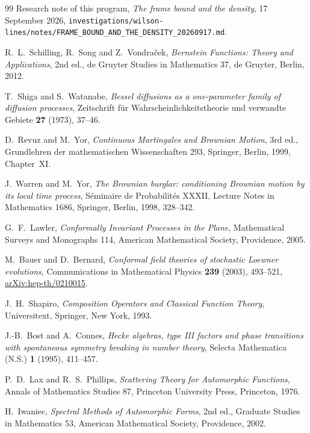 \begin{thebibliography}{99}
Research note of this program, \emph{The frame bound and the density},
17 September 2026,
\texttt{investigations/wilson-lines/notes/\allowbreak FRAME\_BOUND\_AND\_THE\_DENSITY\_20260917.md}.

R.~L.~Schilling, R.~Song and Z.~Vondra\v{c}ek, \emph{Bernstein Functions:
Theory and Applications}, 2nd ed., de Gruyter Studies in Mathematics 37,
de Gruyter, Berlin, 2012.

T.~Shiga and S.~Watanabe, \emph{Bessel diffusions as a one-parameter family of
diffusion processes}, Zeitschrift f\"ur Wahrscheinlichkeitstheorie und
verwandte Gebiete \textbf{27} (1973), 37--46.

D.~Revuz and M.~Yor, \emph{Continuous Martingales and Brownian Motion},
3rd ed., Grundlehren der mathematischen Wissenschaften 293, Springer, Berlin,
1999, Chapter~XI.

J.~Warren and M.~Yor, \emph{The Brownian burglar: conditioning Brownian motion
by its local time process}, S\'eminaire de Probabilit\'es XXXII, Lecture Notes
in Mathematics 1686, Springer, Berlin, 1998, 328--342.

G.~F.~Lawler, \emph{Conformally Invariant Processes in the Plane},
Mathematical Surveys and Monographs 114, American Mathematical Society,
Providence, 2005.

M.~Bauer and D.~Bernard, \emph{Conformal field theories of stochastic Loewner
evolutions}, Communications in Mathematical Physics \textbf{239} (2003),
493--521, \href{https://arxiv.org/abs/hep-th/0210015}{arXiv:hep-th/0210015}.

J.~H.~Shapiro, \emph{Composition Operators and Classical Function Theory},
Universitext, Springer, New York, 1993.

J.-B.~Bost and A.~Connes, \emph{Hecke algebras, type III factors and phase
transitions with spontaneous symmetry breaking in number theory}, Selecta
Mathematica (N.S.) \textbf{1} (1995), 411--457.

P.~D.~Lax and R.~S.~Phillips, \emph{Scattering Theory for Automorphic
Functions}, Annals of Mathematics Studies 87, Princeton University Press,
Princeton, 1976.

H.~Iwaniec, \emph{Spectral Methods of Automorphic Forms}, 2nd ed., Graduate
Studies in Mathematics 53, American Mathematical Society, Providence, 2002.
\end{thebibliography}
